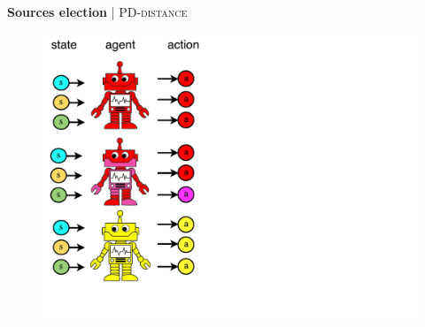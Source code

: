 \documentclass[french,handout]{beamer}
\begin{document}
    \begin{frame}{\textbf{Sources election} | \textsc{PD-distance}}
        \begin{figure}
            \begin{center}
                \includegraphics[width=1.0\textwidth]{img/pddistance0.pdf}
            \end{center}
        \end{figure}
    \end{frame}
\end{document}
